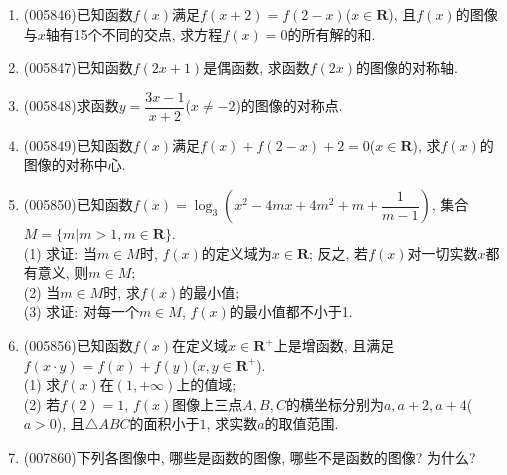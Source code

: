 \documentclass[10pt,a4paper]{article}
\begin{document}
\begin{enumerate}[1.]
\item {\tiny (005846)}已知函数$f(x)$满足$f(x+2)=f(2-x)$($x\in \mathbf{R}$), 且$f(x)$的图像与$x$轴有15个不同的交点, 求方程$f(x)=0$的所有解的和.
\item {\tiny (005847)}已知函数$f(2x+1)$是偶函数, 求函数$f(2x)$的图像的对称轴.
\item {\tiny (005848)}求函数$y=\dfrac{3x-1}{x+2}$($x\ne -2$)的图像的对称点.
\item {\tiny (005849)}已知函数$f(x)$满足$f(x)+f(2-x)+2=0$($x\in \mathbf{R}$), 求$f(x)$的图像的对称中心.
\item {\tiny (005850)}已知函数$f(x)=\log_3(x^2-4mx+4m^2+m+\dfrac 1{m-1})$, 集合$M=\{m|m>1,m\in \mathbf{R}\}$.\\
(1) 求证: 当$m\in M$时, $f(x)$的定义域为$x\in \mathbf{R}$; 反之, 若$f(x)$对一切实数$x$都有意义, 则$m\in M$;\\
(2) 当$m\in M$时, 求$f(x)$的最小值;\\
(3) 求证: 对每一个$m\in M$, $f(x)$的最小值都不小于1.
\item {\tiny (005856)}已知函数$f(x)$在定义域$x\in \mathbf{R}^+$上是增函数, 且满足$f(x\cdot y)=f(x)+f(y)$($x,y\in \mathbf{R}^+$).\\
(1) 求$f(x)$在$(1,+\infty)$上的值域;\\
(2) 若$f(2)=1$, $f(x)$图像上三点$A,B,C$的横坐标分别为$a,a+2,a+4$($a>0$), 且$\triangle ABC$的面积小于$1$, 求实数$a$的取值范围.
\item {\tiny (007860)}下列各图像中, 哪些是函数的图像, 哪些不是函数的图像? 为什么?
\begin{center}
\end{center}
\end{enumerate}
\end{document}
